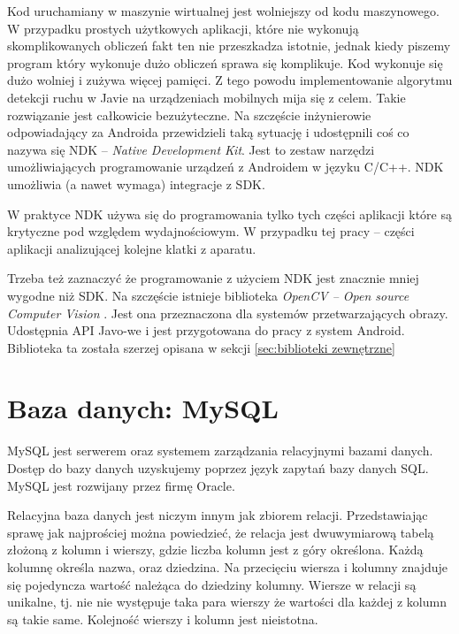 Kod uruchamiany w maszynie wirtualnej jest wolniejszy od kodu maszynowego. W przypadku prostych użytkowych aplikacji, które nie wykonują skomplikowanych obliczeń fakt ten nie przeszkadza istotnie, jednak kiedy piszemy program który wykonuje dużo obliczeń sprawa się komplikuje. Kod wykonuje się dużo wolniej i zużywa więcej pamięci. Z tego powodu implementowanie algorytmu detekcji ruchu w Javie na urządzeniach mobilnych mija się z celem. Takie rozwiązanie jest całkowicie bezużyteczne. Na szczęście inżynierowie odpowiadający za Androida przewidzieli taką sytuację i udostępnili coś co nazywa się NDK -- {\it Native Development Kit}. Jest to zestaw narzędzi umożliwiających programowanie urządzeń z Androidem w języku C/C++. NDK umożliwia (a nawet wymaga) integracje z SDK. 

W praktyce NDK używa się do programowania tylko tych części aplikacji które są krytyczne pod względem wydajnościowym. W przypadku tej pracy -- części aplikacji analizującej kolejne klatki z aparatu. 

Trzeba też zaznaczyć że programowanie z użyciem NDK jest znacznie mniej wygodne niż SDK. Na szczęście istnieje biblioteka {\it OpenCV -- Open source Computer Vision} \cite{Opencv}. Jest ona przeznaczona dla systemów przetwarzających obrazy. Udostępnia API Javo-we i jest przygotowana do pracy z system Android. Biblioteka ta została szerzej opisana w sekcji \ref{sec:biblioteki zewnętrzne} 

%

\section{Baza danych: MySQL}
\label{sec:baza danych}

MySQL \cite{Mysql} jest serwerem oraz systemem zarządzania relacyjnymi bazami danych. Dostęp do bazy danych uzyskujemy poprzez język zapytań bazy danych SQL. MySQL jest rozwijany przez firmę Oracle. 

Relacyjna baza danych jest niczym innym jak zbiorem relacji. Przedstawiając sprawę jak najprościej można powiedzieć, że relacja jest dwuwymiarową tabelą złożoną z kolumn i wierszy, gdzie liczba kolumn jest z góry określona. Każdą kolumnę określa nazwa, oraz dziedzina. Na przecięciu wiersza i kolumny znajduje się pojedyncza wartość należąca do dziedziny kolumny. Wiersze w relacji są unikalne, tj. nie nie występuje taka para wierszy że wartości dla każdej z kolumn są takie same. 
Kolejność wierszy i kolumn jest nieistotna. 


